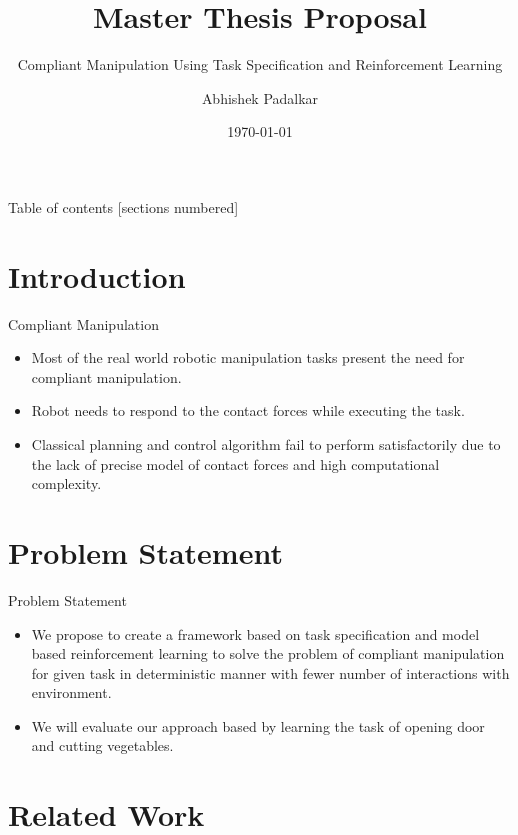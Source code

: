 \documentclass[10pt]{beamer}
\title{Master Thesis Proposal}
\subtitle{Compliant Manipulation Using Task Specification and Reinforcement Learning}
\date{\today}
\author{Abhishek Padalkar}
\institute{Hochschule Bonn-Rhein-Sieg, Sankt Augustin}
\begin{document}
\maketitle

\begin{frame}{Table of contents}
  [sections numbered]
  \tableofcontents[hideallsubsections]
\end{frame}

\section{Introduction}

\begin{frame}[fragile]{Compliant Manipulation}
	\begin{itemize}
		\item Most of the real world robotic manipulation tasks present the need for compliant manipulation.
		\item Robot needs to respond to the contact forces while executing the task. 
		\item Classical planning and control algorithm fail to perform satisfactorily due to the lack of precise model of contact forces and high computational complexity.
	\end{itemize}
\end{frame}

\section{Problem Statement}

\begin{frame}{Problem Statement}
	
	\begin{itemize}
		\item We propose to create a framework based on task specification and model based reinforcement learning to solve the problem of compliant manipulation for given task in deterministic manner with fewer number of interactions with environment.
		\item We will evaluate our approach based by learning the task of opening door and cutting vegetables.
	\end{itemize}
\end{frame}

\section{Related Work}
\end{document}
